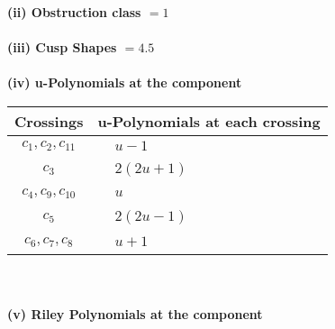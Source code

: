 \documentclass[1p]{elsarticle_modified}
\theoremstyle{definition}
\begin{document}
\flushleft \textbf{(ii) Obstruction class $= 1$}\\~\\
\flushleft \textbf{(iii) Cusp Shapes $= 4.5$}\\~\\
\newpage\renewcommand{\arraystretch}{1}
\flushleft \textbf{(iv) u-Polynomials at the component}\newline \\
\begin{tabular}{m{50pt}|m{274pt}}
Crossings & \hspace{64pt}u-Polynomials at each crossing \\
\hline $$\begin{aligned}c_{1},c_{2},c_{11}\end{aligned}$$&$\begin{aligned}
&u-1
\end{aligned}$\\
\hline $$\begin{aligned}c_{3}\end{aligned}$$&$\begin{aligned}
&2(2 u+1)
\end{aligned}$\\
\hline $$\begin{aligned}c_{4},c_{9},c_{10}\end{aligned}$$&$\begin{aligned}
&u
\end{aligned}$\\
\hline $$\begin{aligned}c_{5}\end{aligned}$$&$\begin{aligned}
&2(2 u-1)
\end{aligned}$\\
\hline $$\begin{aligned}c_{6},c_{7},c_{8}\end{aligned}$$&$\begin{aligned}
&u+1
\end{aligned}$\\
\hline
\end{tabular}\\~\\
\newpage\renewcommand{\arraystretch}{1}
\flushleft \textbf{(v) Riley Polynomials at the component}\newline \\
\end{document}
